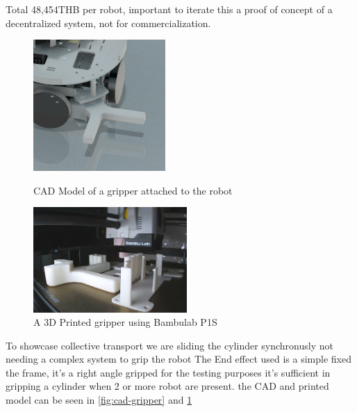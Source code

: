 Total 48,454THB per robot, important to iterate this a proof of concept of a decentralized system, not for commercialization.



\begin{figure}[!htb]
    \begin{minipage}{0.41\textwidth}
        \includegraphics[height=5cm]{assets/images/hardware/cad-gripper.png}
        \caption{CAD Model of a gripper attached to the robot}
        \label{fig:cad-gripper}
    \end{minipage}
    \hspace{0.1\textwidth} %
    \begin{minipage}{0.41\textwidth}
        \includegraphics[height=4cm]{assets/images/hardware/3d-print-endeffect-access.png-0001.png}
        \caption{A 3D Printed gripper using Bambulab P1S}
        \label{fig:printed-gripper}
    \end{minipage}
\end{figure}
To showcase collective transport we are sliding the cylinder synchronusly not needing a complex system to grip the robot
The End effect used is a simple fixed the frame, it's a right angle gripped for the testing purposes it's sufficient in gripping a cylinder when 2 or more robot are present. the CAD and printed model can be seen in \ref{fig:cad-gripper} and \ref{fig:printed-gripper}



